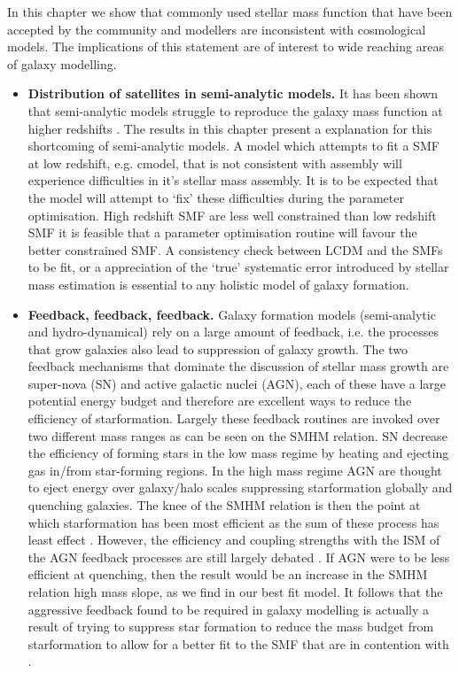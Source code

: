 In this chapter we show that commonly used stellar mass function that have been accepted by the community and modellers are inconsistent with \LCDM cosmological models. The implications of this statement are of interest to wide reaching areas of galaxy modelling. 
\begin{itemize}
    \item \textbf{Distribution of satellites in semi-analytic models.} It has been shown that semi-analytic models struggle to reproduce the galaxy mass function at higher redshifts \citep[e.g.][]{Asquith2018CosmicModels}. 
    The results in this chapter present a explanation for this shortcoming of semi-analytic models. A model which attempts to fit a SMF at low redshift, e.g. cmodel, that is not consistent with \LCDM assembly will experience difficulties in it's stellar mass assembly. It is to be expected that the model will attempt to `fix' these difficulties during the parameter optimisation. High redshift SMF are less well constrained than low redshift SMF it is feasible that a parameter optimisation routine will favour the better constrained SMF. A consistency check between LCDM and the SMFs to be fit, or a appreciation of the `true' systematic error introduced by stellar mass estimation is essential to any holistic model of galaxy formation.
    \item \textbf{Feedback, feedback, feedback.} Galaxy formation models (semi-analytic and hydro-dynamical) rely on a large amount of feedback, i.e. the processes that grow galaxies also lead to suppression of galaxy growth. The two feedback mechanisms that dominate the discussion of stellar mass growth are super-nova (SN) and active galactic nuclei (AGN), each of these have a large potential energy budget and therefore are excellent ways to reduce the efficiency of starformation. Largely these feedback routines are invoked over two different mass ranges as can be seen on the SMHM relation. SN decrease the efficiency of forming stars in the low mass regime by heating and ejecting gas in/from star-forming regions. In the high mass regime AGN are thought to eject energy over galaxy/halo scales suppressing starformation globally and quenching galaxies. The knee of the SMHM relation is then the point at which starformation has been most efficient as the sum of these process has least effect \cite{Shankar2006NewFormation}. However, the efficiency and coupling strengths with the ISM of the AGN feedback processes are still largely debated \cite[e.g.]{Fiore2017AGNGalaxies}. If AGN were to be less efficient at quenching, then the result would be an increase in the SMHM relation high mass slope, as we find in our best fit model. It follows that the aggressive feedback found to be required in galaxy modelling is actually a result of trying to suppress star formation to reduce the mass budget from starformation to allow for a better fit to the SMF that are in contention with \LCDM.

\end{itemize}
